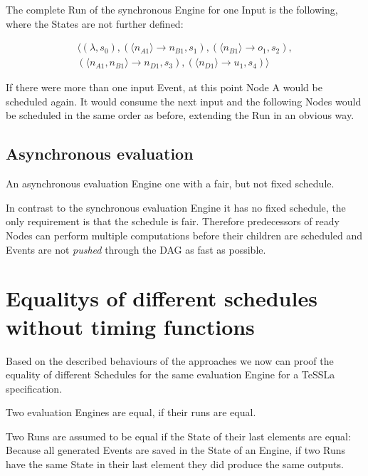 The complete Run of the synchronous Engine for one Input is the following, where the States are not further defined:

\begin{align*}
  \langle
    (\lambda,                                           s_0),
    (\langle n_{A1}         \rangle\rightarrow n_{B1},  s_1),
    (\langle n_{B1}         \rangle\rightarrow o_1,     s_2),\\
    (\langle n_{A1}, n_{B1} \rangle\rightarrow n_{D1},  s_3),
    (\langle n_{D1}         \rangle\rightarrow u_1,     s_4)
  \rangle
\end{align*}

If there were more than one input Event, at this point Node A would be scheduled again.
It would consume the next input and the following Nodes would be scheduled in the same order as before, extending the Run in an obvious way.

\subsection{Asynchronous evaluation}
\label{sec:concepts:behaviour_without_timing:async}

An asynchronous evaluation Engine one with a fair, but not fixed schedule.

In contrast to the synchronous evaluation Engine it has no fixed schedule, the only requirement is that the schedule is fair.
Therefore predecessors of ready Nodes can perform multiple computations before their children are scheduled and Events are not \emph{pushed} through the DAG as fast as possible.

\section{Equalitys of different schedules without timing functions}
\label{sec:concepts:equalitys_without_timing}

Based on the described behaviours of the approaches we now can proof the equality of different Schedules for the same evaluation Engine for a TeSSLa specification.

\begin{lemma}
  Two evaluation Engines are equal, if their runs are equal.
\label{lemma:eval_equal_if_runs_equal}
\end{lemma}

Two Runs are assumed to be equal if the State of their last elements are equal:
Because all generated Events are saved in the State of an Engine, if two Runs have the same State in their last element they did produce the same outputs.


